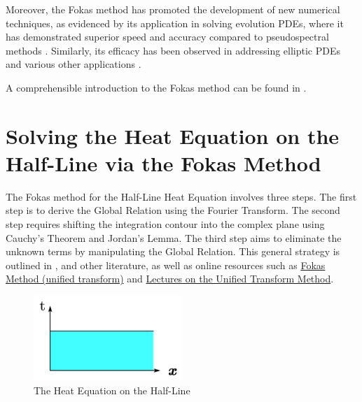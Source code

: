 \documentclass[12pt]{article}
\numberwithin{equation}{section}
\begin{document}
Moreover, the Fokas method has promoted the development of new numerical techniques, as evidenced by its application in solving evolution PDEs, where it has demonstrated superior speed and accuracy compared to pseudospectral methods \cite{vetra2007computation}. Similarly, its efficacy has been observed in addressing elliptic PDEs and various other applications \cite{fornberg2011numerical, ambrose2014fokas}.

A comprehensible introduction to the Fokas method can be found in \cite{deconinck2014method}. 
\newpage
\section{Solving the Heat Equation on the Half-Line via the Fokas Method }
The Fokas method for the Half-Line Heat Equation involves three steps. The first step is to derive the Global Relation using the Fourier Transform. The second step requires shifting the integration contour into the complex plane using Cauchy's Theorem and Jordan's Lemma. The third step aims to eliminate the unknown terms by manipulating the Global Relation. This general strategy is outlined in \cite{fokas2002new,fokas2014unified}, and other literature, as well as online resources such as \href{https://www.damtp.cam.ac.uk/user/examples/3N15.pdf}{Fokas Method (unified transform)} and \href{https://www.dropbox.com/s/udqdhd19wh7jg6o/unified.pdf?e=1}{Lectures on the Unified Transform Method}.
\begin{figure}[h]
    \centering \hspace{5mm}
    \includegraphics[width=0.50\textwidth]{half-line heat eqn.pic.jpg}
    \caption{The Heat Equation on the Half-Line}
    \label{1}
\end{figure}
\end{document}
